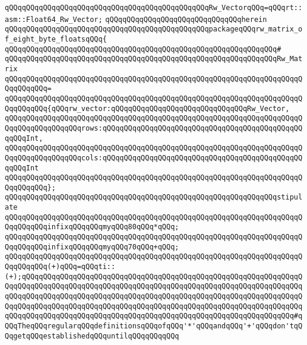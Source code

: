\verb|qQQqqQQqqQQqqQQqqQQqqQQqqQQqqQQqqQQqqQQqqQQqqQQqRw_VectorqQQq=qQQqrt::asm::Float64_Rw_Vector;|\newline
\verb|qQQqqQQqqQQqqQQqqQQqqQQqqQQqqQQqherein|\newline
\verb|qQQqqQQqqQQqqQQqqQQqqQQqqQQqqQQqqQQqqQQqqQQqqQQqpackageqQQqrw_matrix_of_eight_byte_floatsqQQq{|\newline
\verb|qQQqqQQqqQQqqQQqqQQqqQQqqQQqqQQqqQQqqQQqqQQqqQQqqQQqqQQqqQQqqQQq#|\newline
\verb|qQQqqQQqqQQqqQQqqQQqqQQqqQQqqQQqqQQqqQQqqQQqqQQqqQQqqQQqqQQqqQQqRw_Matrix|\newline
\verb|qQQqqQQqqQQqqQQqqQQqqQQqqQQqqQQqqQQqqQQqqQQqqQQqqQQqqQQqqQQqqQQqqQQqqQQqqQQqqQQq=|\newline
\verb|qQQqqQQqqQQqqQQqqQQqqQQqqQQqqQQqqQQqqQQqqQQqqQQqqQQqqQQqqQQqqQQqqQQqqQQqqQQqqQQq{qQQqrw_vector:qQQqqQQqqQQqqQQqqQQqqQQqqQQqqQQqRw_Vector,|\newline
\verb|qQQqqQQqqQQqqQQqqQQqqQQqqQQqqQQqqQQqqQQqqQQqqQQqqQQqqQQqqQQqqQQqqQQqqQQqqQQqqQQqqQQqqQQqrows:qQQqqQQqqQQqqQQqqQQqqQQqqQQqqQQqqQQqqQQqqQQqqQQqqQQqInt,|\newline
\verb|qQQqqQQqqQQqqQQqqQQqqQQqqQQqqQQqqQQqqQQqqQQqqQQqqQQqqQQqqQQqqQQqqQQqqQQqqQQqqQQqqQQqqQQqcols:qQQqqQQqqQQqqQQqqQQqqQQqqQQqqQQqqQQqqQQqqQQqqQQqqQQqInt|\newline
\verb|qQQqqQQqqQQqqQQqqQQqqQQqqQQqqQQqqQQqqQQqqQQqqQQqqQQqqQQqqQQqqQQqqQQqqQQqqQQqqQQq};|\newline
\newline
\verb|qQQqqQQqqQQqqQQqqQQqqQQqqQQqqQQqqQQqqQQqqQQqqQQqqQQqqQQqqQQqqQQqstipulate|\newline
\newline
\verb|qQQqqQQqqQQqqQQqqQQqqQQqqQQqqQQqqQQqqQQqqQQqqQQqqQQqqQQqqQQqqQQqqQQqqQQqqQQqqQQqinfixqQQqqQQqmyqQQq80qQQq*qQQq;|\newline
\verb|qQQqqQQqqQQqqQQqqQQqqQQqqQQqqQQqqQQqqQQqqQQqqQQqqQQqqQQqqQQqqQQqqQQqqQQqqQQqqQQqinfixqQQqqQQqmyqQQq70qQQq+qQQq;|\newline
\newline
\verb|qQQqqQQqqQQqqQQqqQQqqQQqqQQqqQQqqQQqqQQqqQQqqQQqqQQqqQQqqQQqqQQqqQQqqQQqqQQqqQQq(+)qQQq=qQQqti::(+);qQQqqQQqqQQqqQQqqQQqqQQqqQQqqQQqqQQqqQQqqQQqqQQqqQQqqQQqqQQqqQQqqQQqqQQqqQQqqQQqqQQqqQQqqQQqqQQqqQQqqQQqqQQqqQQqqQQqqQQqqQQqqQQqqQQqqQQqqQQqqQQqqQQqqQQqqQQqqQQqqQQqqQQqqQQqqQQqqQQqqQQqqQQqqQQqqQQqqQQqqQQqqQQqqQQqqQQqqQQqqQQqqQQqqQQqqQQqqQQqqQQqqQQqqQQqqQQqqQQqqQQqqQQqqQQqqQQqqQQqqQQqqQQqqQQqqQQqqQQqqQQqqQQqqQQqqQQqqQQqqQQqqQQqqQQqqQQqqQQqqQQq#qQQqTheqQQqregularqQQqdefinitionsqQQqofqQQq'*'qQQqandqQQq'+'qQQqdon'tqQQqgetqQQqestablishedqQQquntilqQQqqQQqqQQq|\newline
